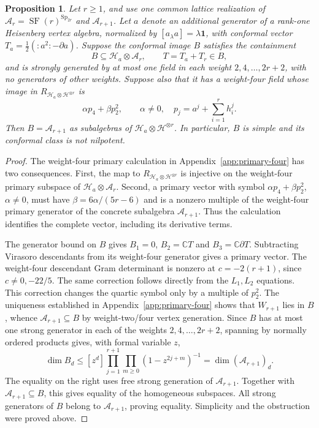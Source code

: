 \documentclass[11pt,a4paper]{amsart}
\numberwithin{equation}{section}
\newtheorem{proposition}[theorem]{Proposition}
\theoremstyle{definition}
\theoremstyle{remark}
\newcommand{\C}{\mathbb C}
\newcommand{\SF}{\operatorname{SF}}
\newcommand{\Sp}{\operatorname{Sp}}
\begin{document}
\begin{proposition}
\label{com:sf-recognition}\label{vtwo:scalar-recognition}
Let $r\ge1$, and use one common lattice realization of
$\mathcal A_r=\SF(r)^{\Sp_{2r}}$ and $\mathcal A_{r+1}$. Let $a$ denote an additional
generator of a rank-one Heisenberg vertex algebra, normalized by
$[a_\lambda a]=\lambda\mathbf1$, with conformal vector
$T_a=\tfrac12(:a^2:-\partial a)$. Suppose the conformal image $B$
satisfies the containment
$$
 B\subseteq\mathcal H_a\otimes \mathcal A_r,
 \qquad T=T_a+T_r\in B,
$$
and is strongly generated by at most one field in each weight
$2,4,\ldots,2r+2$, with no generators of other weights. Suppose also that it has a
weight-four field whose image in
$R_{\mathcal H_a\otimes\mathcal H^{\otimes r}}$ is
$$
 \alpha p_4+\beta p_2^2,\qquad \alpha\ne0,
 \quad p_j=a^j+\sum_{i=1}^r h_i^j.
$$
Then $B=\mathcal A_{r+1}$ as subalgebras of $\mathcal H_a\otimes\mathcal H^{\otimes r}$. In particular,
$B$ is simple and its conformal class is not nilpotent.
\end{proposition}
\begin{proof}
The weight-four primary calculation in
Appendix~\ref{app:primary-four} has two consequences. First, the map
to $R_{\mathcal H_a\otimes\mathcal H^{\otimes r}}$ is injective on
the weight-four primary subspace of $\mathcal H_a\otimes \mathcal A_r$.
Second, a primary vector with symbol $\alpha p_4+\beta p_2^2$,
$\alpha\ne0$, must have $\beta=6\alpha/(5r-6)$ and is a nonzero
multiple of the weight-four primary generator of the concrete
subalgebra $\mathcal A_{r+1}$. Thus the calculation identifies the complete
vector, including its derivative terms.

The generator bound on $B$ gives $B_1=0$, $B_2=\C T$ and
$B_3=\C\partial T$. Subtracting Virasoro descendants from its weight-four generator gives a primary vector. The weight-four descendant Gram
determinant is nonzero at $c=-2(r+1)$, since $c\ne0,-22/5$. The same correction follows directly from the $L_1,L_2$ equations. This correction changes the
quartic symbol only by a multiple of $p_2^2$. The uniqueness established in Appendix~\ref{app:primary-four}
shows that $W_{r+1}$ lies in $B$, whence $\mathcal A_{r+1}\subseteq B$ by weight-two/four
vertex generation. Since $B$ has at most one strong generator in
each of the weights $2,4,\ldots,2r+2$, spanning by normally ordered
products gives, with formal variable $z$,
$$
 \dim B_d\le [z^d]\prod_{j=1}^{r+1}\prod_{m\ge0}
                         (1-z^{2j+m})^{-1}=\dim(\mathcal A_{r+1})_d.
$$
The equality on the right uses free strong generation of $\mathcal A_{r+1}$.
Together with $\mathcal A_{r+1}\subseteq B$, this gives equality of the
homogeneous subspaces. All strong generators of $B$ belong to $\mathcal A_{r+1}$, proving
equality. Simplicity and the obstruction were proved above.
\end{proof}
\end{document}
